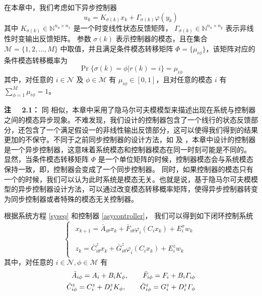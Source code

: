 	在本章中，我们考虑如下异步控制器
	\begin{equation}\label{asycontroller}
	u_k=K_{\sigma(k)}x_k+\varGamma_{\sigma(k)}\varphi(y_k) 
	\end{equation}
	其中 $K_{\sigma(k)}\in \mathbb{N}^{n_u\times n_x}$ 是一个时变线性状态反馈矩阵， $\varGamma_{\sigma(k)}\in \mathbb{N}^{n_u\times n_y}$ 表示非线性时变输出反馈矩阵。 参数 $\sigma(k)$ 表示控制器的模态，且在集合  $\mathcal{M}=\{1,2,\dots,M\}$ 中取值，并且满足条件模态转移矩阵 $\varPhi=\{\mu_{i\phi} \}$，该矩阵对应的条件模态转移概率为
	\begin{equation}
	\Pr\{\sigma(k)=\phi|r(k)=i\}=\mu_{i\phi}
	\end{equation}
	其中，对任意的 $i\in\mathcal{N}$ 及 $\phi\in\mathcal{M}$ 有 $\mu_{i\phi}\in [0,1]$，且对任意的模态 $i$ 有 $\sum_{\phi=1}^{M}\mu_{i\phi}=1$。
	
	{\bf 注 \ \ 2.1：} 
	同 \cite{passive_wu} 相似，本章中采用了隐马尔可夫模模型来描述出现在系统与控制器之间的模态异步现象。不难发现，我们设计的控制器包含了一个线行的状态反馈部分，还包含了一个满足假设一的非线性输出反馈部分，这可以使得我们得到的结果更加的不保守。不同于之前同步控制器的设计方法，如\cite{song_control} 及 \cite{costaolv_control_1}，本章中设计的控制器是一个异步控制器，这意味着系统模态和控制器模态在同一时刻可能是不同的。 显然，当条件模态转移矩阵 $\varPhi$ 是一个单位矩阵的时候，控制器模态会与系统模态保持一致，即，控制器会变成了一个同步控制器。 同时，如果控制器的模态只有一个的时候，我们可以认为此时系统是模态无关。也就是说，基于隐马尔可夫模模型的异步控制器设计方法，可以通过改变模态转移概率矩阵，使得异步控制器转变为同步控制器或者特殊的模态无关控制器。
	
	根据系统方程 \eqref{syseq} 和控制器 \eqref{asycontroller}， 我们可以得到如下闭环控制系统
	\begin{equation}\label{close_system_equation_2}
	\left\{
	\begin{array}{lr}
	\begin{split}
	x_{k+1}=\bar{A}_{i\theta}x_k+\bar{F}_{i\theta}\varphi_{i}(C_ix_k)+E_i^xw_k\\
	\end{split}
	\\
	\begin{split}
	z_k=\bar{C}^{z}_{i\theta}x_k+\bar{G}^{z}_{i\theta}\varphi_{i}(C_ix_k)+E^z_iw_k
	\end{split}
	\end{array}
	\right.
	\end{equation} 
	其中，对任意的 $i \in \mathcal{N}, \phi \in \mathcal{M}$ 有
	\begin{equation} \notag
	\begin{aligned}
	\bar{A}_{i\phi}=A_{i}+B_{i}K_{\phi},  \qquad \bar{F}_{i\phi}=F_{i}+B_{i}\varGamma_{i\phi} \\
	\bar{C}^{z}_{i\phi}=C^{z}_{i}+D^{z}_{i}K_{\phi}, \qquad \bar{G}^{z}_{i\phi}=G^{z}_{i}+D^{z}_{i}\varGamma_{\phi}
	\end{aligned}
	\end{equation}
	

